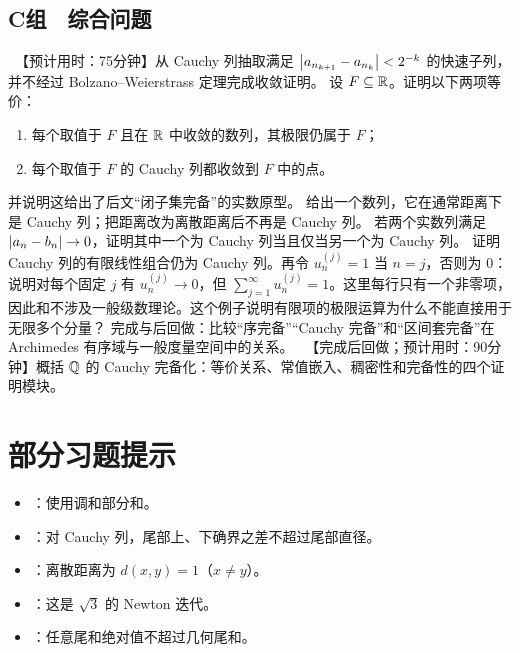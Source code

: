 \subsection*{C组　综合问题}
\begin{enumerate}[label=\textbf{\thechapter.\arabic*.},resume]
  \ 【预计用时：75分钟】从 Cauchy 列抽取满足
 \(\left|a_{n_{k+1}}-a_{n_k}\right|<2^{-k}\) 的快速子列，并不经过 Bolzano--Weierstrass 定理完成收敛证明。
  设 \(F\subseteq\mathbb{R}\)。证明以下两项等价：
 \begin{enumerate}[label=(\arabic*)]
  \item 每个取值于 \(F\) 且在 \(\mathbb{R}\) 中收敛的数列，其极限仍属于 \(F\)；
  \item 每个取值于 \(F\) 的 Cauchy 列都收敛到 \(F\) 中的点。
 \end{enumerate}
 并说明这给出了后文“闭子集完备”的实数原型。
  给出一个数列，它在通常距离下是 Cauchy 列；把距离改为离散距离后不再是 Cauchy 列。
  若两个实数列满足 \(\left|a_n-b_n\right|\to0\)，证明其中一个为 Cauchy 列当且仅当另一个为 Cauchy 列。
  证明 Cauchy 列的有限线性组合仍为 Cauchy 列。再令 \(u_n^{(j)}=1\) 当 \(n=j\)，否则为 \(0\)：说明对每个固定 \(j\) 有 \(u_n^{(j)}\to0\)，但 \(\sum_{j=1}^{\infty}u_n^{(j)}=1\)。这里每行只有一个非零项，因此和不涉及一般级数理论。这个例子说明有限项的极限运算为什么不能直接用于无限多个分量？
  完成与后回做：比较“序完备”“Cauchy 完备”和“区间套完备”在 Archimedes 有序域与一般度量空间中的关系。
  \ 【完成后回做；预计用时：90分钟】概括 \(\mathbb{Q}\) 的 Cauchy 完备化：等价关系、常值嵌入、稠密性和完备性的四个证明模块。
\end{enumerate}

\section*{部分习题提示}
\begin{itemize}
 \item {}：使用调和部分和。
 \item {}：对 Cauchy 列，尾部上、下确界之差不超过尾部直径。
 \item {}：离散距离为 \(d(x,y)=1\)（\(x\ne y\)）。
 \item {}：这是 \(\sqrt3\) 的 Newton 迭代。
 \item {}：任意尾和绝对值不超过几何尾和。
\end{itemize}
